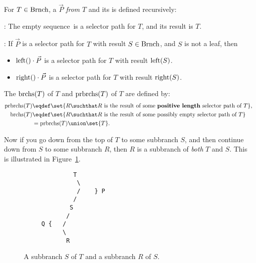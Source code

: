 \begin{definition}
For $T \in \text{Brnch}$, a  $\vec{P}$ \emph{from $T$}
and its  is defined recursively:

: The empty sequence\emptystring\ is a
selector path for $T$, and its result is $T$.

: If $\vec{P}$ is a selector path
for $T$ with result $S \in \text{Brnch}$, and $S$ is not a leaf, then
\begin{itemize}
\item $\text{left}() \cdot \vec{P}$ is a selector path
for $T$ with result $\text{left}(S)$.

\item $\text{right}() \cdot \vec{P}$ is a selector path
for $T$ with result $\text{right}(S)$.
\end{itemize}

The  $\text{brchs}(T)$ of $T$ and 
$\text{prbrchs}(T)$ of $T$ are defined by:
\begin{align*}
\propbrn{T} & \eqdef \set{R \suchthat R\ \text{is the result of some
    \textbf{positive length} selector path of}\ T},\\
\subbrn{T} & \eqdef \set{R \suchthat R\ \text{is the result of some possibly empty
    selector path of}\ T}\\
          & = \propbrn{T} \union \set{T}.
\end{align*}
\end{definition}

Now if you go down from the top of $T$ to some subbranch $S$, and then
continue down from $S$ to some subbranch $R$, then $R$ is a subbranch
of \emph{both} $T$ and $S$.  This is illustrated in Figure~\ref{PQdown}.

\begin{figure}


\begin{center}
\begin{verbatim}
              T
               \
               /    } P
              /
             S
            /
     Q {   /
           \
            R
\end{verbatim}   
\end{center}

\caption{A subbranch $S$ of $T$ and  a subbranch $R$ of $S$.}

\label{PQdown}

\end{figure}


